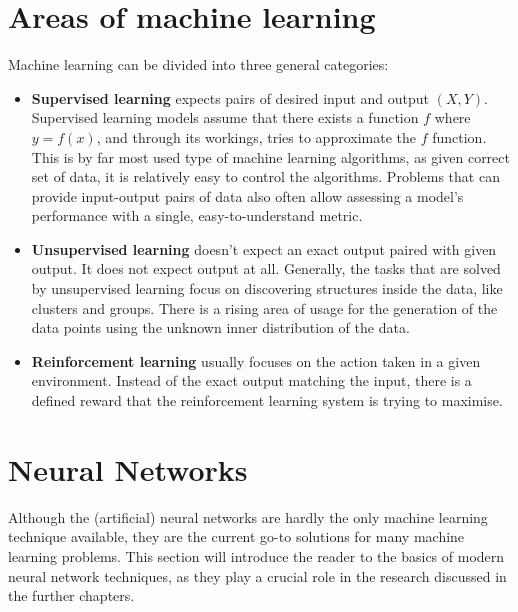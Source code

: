 

\section{Areas of machine learning}

Machine learning can be divided into three general categories:
\begin{itemize}
\item \textbf{Supervised learning} expects pairs of desired input and output $(X,Y)$.
Supervised learning models assume that there exists a function $f$ where $y = f(x)$, and through its workings, tries to approximate the $f$ function.
This is by far most used type of machine learning algorithms, as given correct set of data, it is relatively easy to control the algorithms.
Problems that can provide input-output pairs of data also often allow assessing a model's performance with a single, easy-to-understand metric.

\item \textbf{Unsupervised learning} doesn't expect an exact output paired with given output. It does not expect output at all.
Generally, the tasks that are solved by unsupervised learning focus on discovering structures inside the data, like clusters and groups. There is a rising area of usage for the generation of the data points using the unknown inner distribution of the data.

\item \textbf{Reinforcement learning} usually focuses on the action taken in a given environment. Instead of the exact output matching the input, there is a defined reward that the reinforcement learning system is trying to maximise.

\end{itemize}
\section{Neural Networks}

Although the (artificial) neural networks are hardly the only machine learning technique available, they are the current go-to solutions for many  machine learning problems. This section will introduce the reader to the basics of modern neural network techniques, as they play a crucial role in the research discussed in the further chapters.

